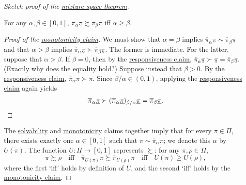 \begin{proof}[Sketch proof of the {\hyperref[theorem:mix]{mixture-space theorem}}]
	\begin{namedthm}
		\label{claim:mix:mon}
		For any $\alpha,\beta \in [0,1]$, $\overline{\pi}_\alpha \underline{\pi} \succsim \overline{\pi}_\beta \underline{\pi}$ iff $\alpha \geq \beta$.
	\end{namedthm}

	\begin{proof}[Proof of the {\hyperref[claim:mix:solv]{monotonicity claim}}]
		\renewcommand{\qedsymbol}{$\square$}
		We must show that $\alpha=\beta$ implies $\overline{\pi}_\alpha \underline{\pi} \sim \overline{\pi}_\beta \underline{\pi}$ and that $\alpha > \beta$ implies $\overline{\pi}_\alpha \underline{\pi} \succ \overline{\pi}_\beta \underline{\pi}$. The former is immediate. For the latter, suppose that $\alpha>\beta$. If $\beta=0$, then by the \hyperref[claim:mix:strict]{responsiveness claim}, $\overline{\pi}_\alpha \underline{\pi} \succ \underline{\pi} = \overline{\pi}_\beta \underline{\pi}$. (Exactly why does the equality hold?) Suppose instead that $\beta>0$. By the \hyperref[claim:mix:strict]{responsiveness claim}, $\overline{\pi}_\alpha \underline{\pi} \succ \underline{\pi}$. Since $\beta/\alpha \in (0,1)$, applying the \hyperref[claim:mix:strict]{responsiveness claim} again yields
		\begin{equation*}
			\overline{\pi}_\alpha \underline{\pi}
			\succ ( \overline{\pi}_\alpha \underline{\pi} )_{\beta/\alpha} \underline{\pi}
			= \overline{\pi}_\beta \underline{\pi} .
			\qedhere
		\end{equation*}
	\end{proof}%
	\renewcommand{\qedsymbol}{$\blacksquare$}

	The \hyperref[claim:mix:solv]{solvability} and \hyperref[claim:mix:mon]{monotonicity} claims together imply that for every $\pi \in \Pi$, there exists exactly one $\alpha \in [0,1]$ such that $\pi \sim \overline{\pi}_\alpha \underline{\pi}$; we denote this $\alpha$ by $U(\pi)$. The function $U : \Pi \to [0,1]$ represents $\succsim$: for any $\pi,\rho \in \Pi$,
	\begin{equation*}
		\pi \succsim \rho
		\quad \text{iff} \quad
		\overline{\pi}_{U(\pi)} \underline{\pi}
		\succsim \overline{\pi}_{U(\rho)} \underline{\pi}
		\quad \text{iff} \quad
		U(\pi) \geq U(\rho) ,
	\end{equation*}
	where the first `iff' holds by definition of $U$, and the second `iff' holds by the \hyperref[claim:mix:mon]{monotonicity claim}.


\end{proof}

